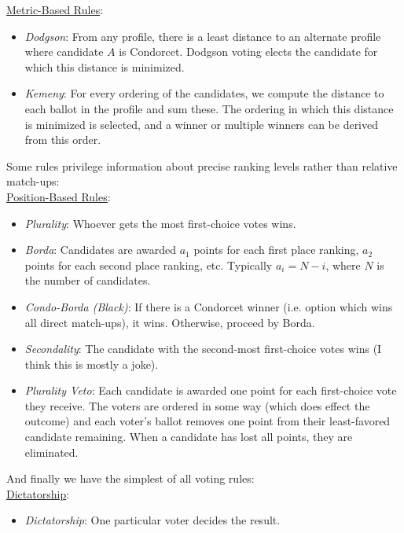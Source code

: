 \documentclass{amsart}
\begin{document}
\noindent \underline{Metric-Based Rules}:
\begin{itemize}
	\item \textit{Dodgson}: From any profile, there is a least distance to an alternate profile where candidate $A$ is Condorcet. Dodgson voting elects the candidate for which this distance is minimized.
	\item \textit{Kemeny}: For every ordering of the candidates, we compute the distance to each ballot in the profile and sum these. The ordering in which this distance is minimized is selected, and a winner or multiple winners can be derived from this order. \\
\end{itemize}

Some rules privilege information about precise ranking levels rather than relative match-ups:\\

\noindent \underline{Position-Based Rules}:
\begin{itemize}
	\item \textit{Plurality}: Whoever gets the most first-choice votes wins.
	\item \textit{Borda}: Candidates are awarded $a_1$ points for each first place ranking, $a_2$ points for each second place ranking, etc. Typically $a_i=N-i$, where $N$ is the number of candidates.
	\item \textit{Condo-Borda (Black)}: If there is a Condorcet winner (i.e. option which wins all direct match-ups), it wins. Otherwise, proceed by Borda.
	\item \textit{Secondality}: The candidate with the second-most first-choice votes wins (I think this is mostly a joke).
	\item \textit{Plurality Veto}: Each candidate is awarded one point for each first-choice vote they receive. The voters are ordered in some way (which does effect the outcome) and each voter's ballot removes one point from their least-favored candidate remaining. When a candidate has lost all points, they are eliminated.\\
\end{itemize}

And finally we have the simplest of all voting rules:\\

\noindent \underline{Dictatorship}:
\begin{itemize}
\item \textit{Dictatorship}: One particular voter decides the result.
\end{itemize}
\end{document}
